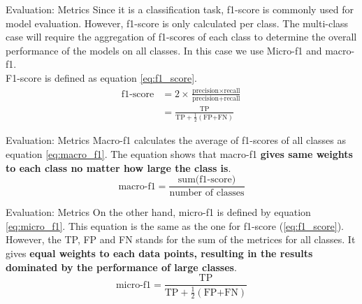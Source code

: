 \begin{frame} {Evaluation: Metrics}
Since it is a classification task, f1-score is commonly used for model evaluation. However, f1-score is only calculated per class. 
The multi-class case will require the aggregation of f1-scores of each class to determine the overall performance of the models on all classes. In this case we use Micro-f1 and macro-f1.
\\ F1-score is defined as equation \autoref{eq:f1_score}.\\[10pt]
\begin{equation}\label{eq:f1_score}
	\begin{split}
		\text{f1-score} &= 2\times \frac{\text{precision} \times \text{recall}}{\text{precision} + \text{recall}}\\
		&= \frac{\text{TP}}{\text{TP}+\frac{1}{2}(\text{FP+FN})}
	\end{split}
\end{equation}
\end{frame} 

\begin{frame} {Evaluation: Metrics}
Macro-f1 calculates the average of f1-scores of all classes as equation \autoref{eq:macro_f1}.
The equation shows that macro-f1 \textbf{gives same weights to each class no matter how large the class is}. 
\begin{equation}\label{eq:macro_f1}
	\text{macro-f1} = \frac{\text{sum(f1-score)}}{\text{number of classes}}
\end{equation}
\end{frame} 

\begin{frame} {Evaluation: Metrics}
On the other hand, micro-f1 is defined by equation \autoref{eq:micro_f1}. This equation is the same as the one for f1-score (\autoref{eq:f1_score}). However, the TP, FP and FN stands for the sum of the metrices for all classes. It gives \textbf{equal weights to each data points, resulting in the results dominated by the performance of large classes}.
\begin{equation}\label{eq:micro_f1}
	\text{micro-f1} = \frac{\text{TP}}{\text{TP}+\frac{1}{2}(\text{FP+FN})}
\end{equation}
\end{frame} 

